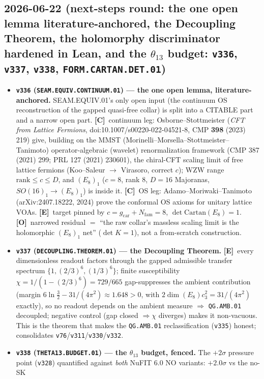 \documentclass[11pt]{article}
\providecommand{\mE}{\textbf{[E]}}\providecommand{\mC}{\textbf{[C]}}
\providecommand{\mO}{\textbf{[O]}}\providecommand{\mX}{\textbf{[X]}}
\providecommand{\vref}[1]{\texttt{#1}}
\providecommand{\gcar}{g_{\mathrm{car}}}\providecommand{\Nfam}{N_{\mathrm{fam}}}
\begin{document}
\subsection*{2026-06-22 (next-steps round: the one open lemma literature-anchored, the Decoupling Theorem, the holomorphy discriminator hardened in Lean, and the $\theta_{13}$ budget: \texttt{v336}, \texttt{v337}, \texttt{v338}, \texttt{FORM.CARTAN.DET.01})}
\begin{itemize}
\item \textbf{\texttt{v336} (\texttt{SEAM.EQUIV.CONTINUUM.01}) --- the one open lemma, literature-anchored.}
SEAM.EQUIV.01's only open input (the continuum OS reconstruction of the gapped quasi-free collar) is split into a
CITABLE part and a narrow open part. \mC\ continuum leg: Osborne--Stottmeister (\emph{CFT
from Lattice Fermions}, doi:10.1007/s00220-022-04521-8, CMP \textbf{398} (2023) 219) give, building on the
MMST (Morinelli--Morsella--Stottmeister--Tanimoto) operator-algebraic (wavelet) renormalization framework
(CMP 387 (2021) 299; PRL 127 (2021) 230601), the chiral-CFT scaling limit of free lattice fermions (Koo--Saleur
$\to$ Virasoro, correct $c$); WZW range $\mathrm{rank}\le c\le D$, and $(E_8)_1$ ($c{=}8$, rank 8, $D{=}16$
Majoranas, $SO(16)_1\!\to\!(E_8)_1$) is inside it. \mC\ OS leg: Adamo--Moriwaki--Tanimoto (arXiv:2407.18222, 2024)
prove the conformal OS axioms for unitary lattice VOAs. \mE\ target pinned by $c{=}\gcar{+}\Nfam{=}8$,
$\det\mathrm{Cartan}(E_8){=}1$. \mO\ narrowed residual $=$ ``the raw collar's massless scaling limit is the
holomorphic $(E_8)_1$ net'' ($\det K{=}1$), not a from-scratch construction.
\item \textbf{\texttt{v337} (\texttt{DECOUPLING.THEOREM.01}) --- the Decoupling Theorem.} \mE\ every dimensionless
readout factors through the gapped admissible transfer spectrum $\{1,(2/3)^6,(1/3)^6\}$; finite susceptibility
$\chi=1/(1-(2/3)^6)=729/665$ gap-suppresses the ambient contribution (margin $6\ln\tfrac32-31/(4\pi^2)\approx
1.648>0$, with $2\dim(E_8)c_3^2=31/(4\pi^2)$ exactly), so no readout depends on the ambient measure $\Rightarrow$
\texttt{QG.AMB.01} decoupled; negative control (gap closed $\Rightarrow\chi$ diverges) makes it non-vacuous. This is
the theorem that makes the \texttt{QG.AMB.01} reclassification (\vref{v335}) honest; consolidates
\vref{v76}/\vref{v311}/\vref{v330}/\vref{v332}.
\item \textbf{\texttt{v338} (\texttt{THETA13.BUDGET.01}) --- the $\theta_{13}$ budget, fenced.} The $+2\sigma$
pressure point (\vref{v328}) quantified against \emph{both} NuFIT 6.0 NO variants: $+2.0\sigma$ vs the no-SK

\end{itemize}
\end{document}
